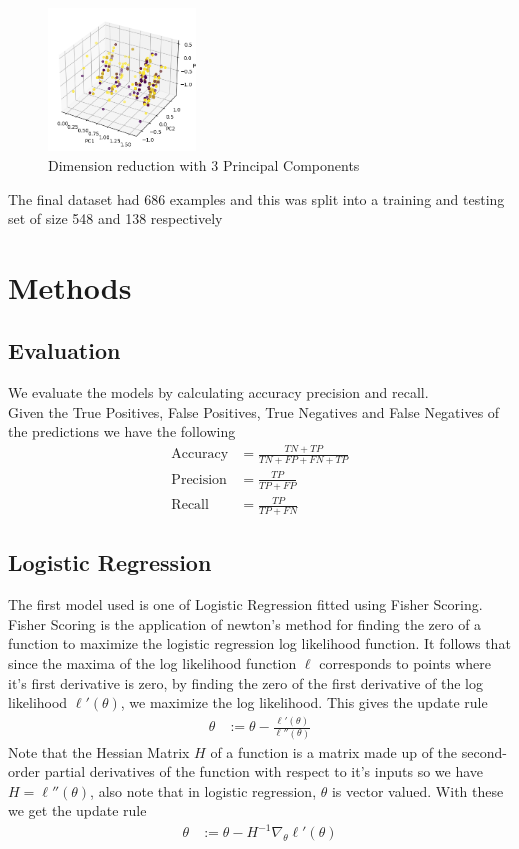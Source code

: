 \documentclass{sigchi}
\begin{document}
\begin{figure}[H]
  \centering
  \includegraphics[width=0.35\textwidth]{figures/3dplot.png}
  \caption{Dimension reduction with 3 Principal Components}
  \label{fig:3PC}
\end{figure}
The final dataset had 686 examples and this was split into a training and testing set of size 548 and 138 respectively
\section{Methods}
\subsection{Evaluation}
We evaluate the models by calculating accuracy precision and recall.\\
Given the True Positives, False Positives, True Negatives and False Negatives of the predictions we have the following
\begin{align}
\text{Accuracy} &= \frac{TN + TP}{TN + FP + FN + TP} \\
\text{Precision} &= \frac{TP}{TP + FP} \\
\text{Recall} &= \frac{TP}{TP + FN}
\end{align}

\subsection{Logistic Regression}
The first model used is one of Logistic Regression fitted using Fisher Scoring. 
Fisher Scoring is the application of newton's method for finding the zero of a function to maximize the logistic regression log likelihood function.
It follows that since the maxima of the log likelihood function $\ell$ corresponds to points where it's first derivative is zero,
by finding the zero of the first derivative of the log likelihood $\ell'(\theta)$, we maximize the log likelihood. This gives the update rule
\begin{align*}
    \theta &:= \theta - \frac{\ell'(\theta)}{\ell''(\theta)}
\end{align*}
Note that the Hessian Matrix $H$ of a function is a matrix made up of the second-order partial derivatives of the function with
respect to it's inputs so we have $H = \ell''(\theta)$, also note that in logistic regression,
$\theta$ is vector valued. With these we get the update rule 
\begin{align*}
    \theta &:= \theta - H^{-1} \nabla_{\theta}\ell'(\theta)
\end{align*}
\end{document}
